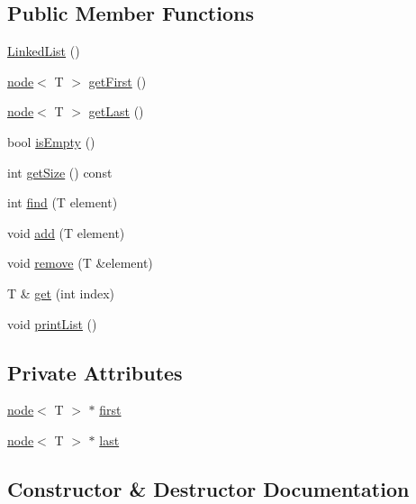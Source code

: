 \subsection*{Public Member Functions}
\begin{DoxyCompactItemize}
\item 
\mbox{\hyperlink{class_linked_list_a3c20fcfec867e867f541061a09fc640c}{Linked\+List}} ()
\item 
\mbox{\hyperlink{structnode}{node}}$<$ T $>$ \mbox{\hyperlink{class_linked_list_a793ceff04b597446486983d4d651e943}{get\+First}} ()
\item 
\mbox{\hyperlink{structnode}{node}}$<$ T $>$ \mbox{\hyperlink{class_linked_list_ad5443b28b382db29e5a5a552b9a3dddc}{get\+Last}} ()
\item 
bool \mbox{\hyperlink{class_linked_list_a7ecbb28e82117a680839ed0dc28ebdce}{is\+Empty}} ()
\item 
int \mbox{\hyperlink{class_linked_list_a2b77410d908509ee9f11497ead71a282}{get\+Size}} () const
\item 
int \mbox{\hyperlink{class_linked_list_a924e217dd525b84492e9f0dc61db96bc}{find}} (T element)
\item 
void \mbox{\hyperlink{class_linked_list_ab7364799e5965dd59d4f5952cb953287}{add}} (T element)
\item 
void \mbox{\hyperlink{class_linked_list_ad2958c4e9413017f354613a5ffe0fc9e}{remove}} (T \&element)
\item 
T \& \mbox{\hyperlink{class_linked_list_aa34d85df4f82f094ba9d6f4708519ebd}{get}} (int index)
\item 
void \mbox{\hyperlink{class_linked_list_af360d4c51f63b7756ac555efbfd5d4b6}{print\+List}} ()
\end{DoxyCompactItemize}
\subsection*{Private Attributes}
\begin{DoxyCompactItemize}
\item 
\mbox{\hyperlink{structnode}{node}}$<$ T $>$ $\ast$ \mbox{\hyperlink{class_linked_list_acaeb0499689a66aa0f0c6f71864da9a2}{first}}
\item 
\mbox{\hyperlink{structnode}{node}}$<$ T $>$ $\ast$ \mbox{\hyperlink{class_linked_list_ab584a6000168e8e43549dffda60240b2}{last}}
\end{DoxyCompactItemize}


\subsection{Constructor \& Destructor Documentation}
\mbox{\label{class_linked_list_a3c20fcfec867e867f541061a09fc640c}} 

